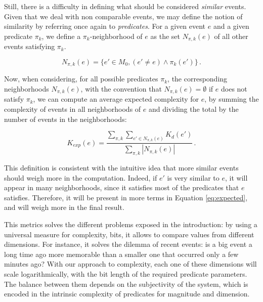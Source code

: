 \documentclass[entropy,article,submit,moreauthors,pdftex]{Definitions/mdpi}
\begin{document}
Still, there is a difficulty in defining what
should be considered \emph{similar} events. Given that we deal with non comparable events, we may define the notion of similarity by referring once again to \emph{predicates}. For a given event $e$ and a given predicate $\pi_k$, we define a $\pi_k$-neighborhood of $e$ as the set $N_{\pi, k}(e)$ of all other events satisfying $\pi_k$.

\begin{equation}
    \label{eq:similar}
    N_{\pi, k}(e) = \{e'\in M_0, (e' \neq e) \wedge \pi_k(e')\}\,.
\end{equation}

Now, when considering, for all possible predicates $\pi_k$, the corresponding
neighborhoods $N_{\pi, k}(e)$, with the convention that $N_{\pi, k}(e) = \emptyset$
if $e$ does not satisfy $\pi_k$, we can compute an average expected complexity for $e$, by summing the complexity of events in all neighborhoods of $e$ and dividing the total by the number of events in the neighborhoods:

\begin{equation}
    \label{eq:expected}
    K_{exp}(e) = \frac{
    \sum_{\pi, k} \sum_{e' \in N_{\pi, k}(e)} K_d(e')
    }{
    \sum_{\pi, k} |N_{\pi, k}(e)|
    }\,.
\end{equation}

This definition is consistent with the intuitive idea that more similar events should weigh more in the computation. Indeed, if $e'$
is very similar to $e$, it will appear in many neighborhoods, since it
satisfies most of the predicates that $e$ satisfies. Therefore, it will
be present in more terms in Equation \ref{eq:expected}, and will weigh more in
the final result.

This metrics solves the different problems exposed in the introduction: by using a universal measure for complexity, bits, it allows to compare values from different dimensions. For instance, it solves the dilemma of recent events: is a big event a long time ago more memorable than a smaller one that occurred only a few minutes ago? With our approach to complexity, each one of these dimensions will scale logarithmically, with the bit length of the required predicate parameters. The balance between them depends on the subjectivity of the system, which is encoded in the intrinsic complexity of predicates for magnitude and dimension. 
\end{document}
